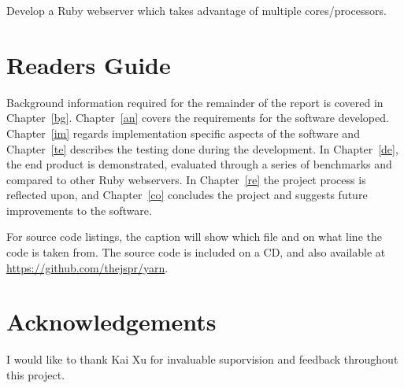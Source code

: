 %
Develop a Ruby webserver which takes advantage of multiple cores/processors.

\section{Readers Guide}
Background information required for the remainder of the report is covered in
Chapter~\ref{bg}. Chapter~\ref{an} covers the requirements for the software
developed. Chapter~\ref{im} regards implementation specific aspects of the
software and Chapter~\ref{te} describes the testing done during the
development. In Chapter~\ref{de}, the end product is demonstrated,
evaluated through a series of benchmarks and compared to other Ruby
webservers. In Chapter~\ref{re} the project process is reflected upon, and
Chapter~\ref{co} concludes the project and suggests future improvements to the
software.

For source code listings, the caption will show which file and on what line
the code is taken from. The source code is included on a CD, and also
available at \url{https://github.com/thejspr/yarn}.


\section{Acknowledgements}
I would like to thank Kai Xu for invaluable suporvision and feedback
throughout this project.
